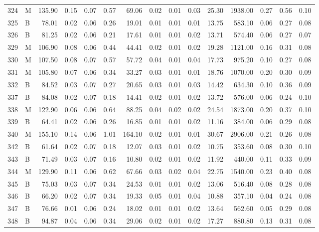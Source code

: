 \begin{table}[ht]
\begin{tabular}{rlrrrrrrrrrrrrr}
  324 & M & 135.90 & 0.15 & 0.07 & 0.57 & 69.06 & 0.02 & 0.01 & 0.03 & 25.30 & 1938.00 & 0.27 & 0.56 & 0.10 \\ 
  325 & B & 78.01 & 0.02 & 0.06 & 0.26 & 19.01 & 0.01 & 0.01 & 0.01 & 13.75 & 583.10 & 0.06 & 0.27 & 0.08 \\ 
  326 & B & 81.25 & 0.02 & 0.06 & 0.21 & 17.61 & 0.01 & 0.01 & 0.02 & 13.71 & 574.40 & 0.06 & 0.27 & 0.07 \\ 
  329 & M & 106.90 & 0.08 & 0.06 & 0.44 & 44.41 & 0.02 & 0.01 & 0.02 & 19.28 & 1121.00 & 0.16 & 0.31 & 0.08 \\ 
  330 & M & 107.50 & 0.08 & 0.07 & 0.57 & 57.72 & 0.04 & 0.01 & 0.04 & 17.73 & 975.20 & 0.10 & 0.27 & 0.08 \\ 
  331 & M & 105.80 & 0.07 & 0.06 & 0.34 & 33.27 & 0.03 & 0.01 & 0.01 & 18.76 & 1070.00 & 0.20 & 0.30 & 0.09 \\ 
  332 & B & 84.52 & 0.03 & 0.07 & 0.27 & 20.65 & 0.03 & 0.01 & 0.03 & 14.42 & 634.30 & 0.10 & 0.36 & 0.09 \\ 
  337 & B & 84.08 & 0.02 & 0.07 & 0.18 & 14.41 & 0.02 & 0.01 & 0.02 & 13.72 & 576.00 & 0.06 & 0.24 & 0.10 \\ 
  338 & M & 122.90 & 0.06 & 0.06 & 0.64 & 88.25 & 0.04 & 0.02 & 0.02 & 24.54 & 1873.00 & 0.20 & 0.37 & 0.10 \\ 
  339 & B & 64.41 & 0.02 & 0.06 & 0.26 & 16.85 & 0.01 & 0.01 & 0.02 & 11.16 & 384.00 & 0.06 & 0.29 & 0.08 \\ 
  340 & M & 155.10 & 0.14 & 0.06 & 1.01 & 164.10 & 0.02 & 0.01 & 0.01 & 30.67 & 2906.00 & 0.21 & 0.26 & 0.08 \\ 
  342 & B & 61.64 & 0.02 & 0.07 & 0.18 & 12.07 & 0.03 & 0.01 & 0.02 & 10.75 & 353.60 & 0.08 & 0.30 & 0.10 \\ 
  343 & B & 71.49 & 0.03 & 0.07 & 0.16 & 10.80 & 0.02 & 0.01 & 0.02 & 11.92 & 440.00 & 0.11 & 0.33 & 0.09 \\ 
  344 & M & 129.90 & 0.11 & 0.06 & 0.62 & 67.66 & 0.03 & 0.02 & 0.04 & 22.75 & 1540.00 & 0.23 & 0.40 & 0.08 \\ 
  345 & B & 75.03 & 0.03 & 0.07 & 0.34 & 24.53 & 0.01 & 0.01 & 0.02 & 13.06 & 516.40 & 0.08 & 0.28 & 0.08 \\ 
  346 & B & 66.20 & 0.02 & 0.07 & 0.34 & 19.33 & 0.05 & 0.01 & 0.04 & 10.88 & 357.10 & 0.04 & 0.24 & 0.08 \\ 
  347 & B & 76.66 & 0.01 & 0.06 & 0.24 & 18.02 & 0.01 & 0.01 & 0.02 & 13.64 & 562.60 & 0.05 & 0.29 & 0.08 \\ 
  348 & B & 94.87 & 0.04 & 0.06 & 0.34 & 29.06 & 0.02 & 0.01 & 0.02 & 17.27 & 880.80 & 0.13 & 0.31 & 0.08 \\ 

\end{tabular}
\end{table}
